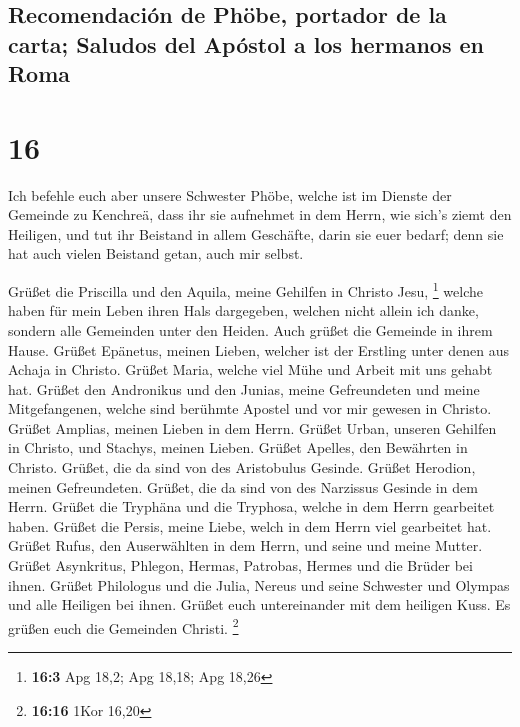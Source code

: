 \hypertarget{recomendaciuxf3n-de-phuxf6be-portador-de-la-carta-saludos-del-apuxf3stol-a-los-hermanos-en-roma}{%
\subsection{Recomendación de Phöbe, portador de la carta; Saludos del
Apóstol a los hermanos en
Roma}\label{recomendaciuxf3n-de-phuxf6be-portador-de-la-carta-saludos-del-apuxf3stol-a-los-hermanos-en-roma}}

\hypertarget{section-15}{%
\section{16}\label{section-15}}

 Ich befehle euch aber unsere Schwester Phöbe, welche ist
im Dienste der Gemeinde zu Kenchreä,  dass ihr sie
aufnehmet in dem Herrn, wie sich's ziemt den Heiligen, und tut ihr
Beistand in allem Geschäfte, darin sie euer bedarf; denn sie hat auch
vielen Beistand getan, auch mir selbst.

 Grüßet die Priscilla und den Aquila, meine Gehilfen in
Christo Jesu, \footnote{\textbf{16:3} Apg 18,2; Apg 18,18; Apg 18,26}
 welche haben für mein Leben ihren Hals dargegeben,
welchen nicht allein ich danke, sondern alle Gemeinden unter den Heiden.
 Auch grüßet die Gemeinde in ihrem Hause. Grüßet Epänetus,
meinen Lieben, welcher ist der Erstling unter denen aus Achaja in
Christo.  Grüßet Maria, welche viel Mühe und Arbeit mit
uns gehabt hat.  Grüßet den Andronikus und den Junias,
meine Gefreundeten und meine Mitgefangenen, welche sind berühmte Apostel
und vor mir gewesen in Christo.  Grüßet Amplias, meinen
Lieben in dem Herrn.  Grüßet Urban, unseren Gehilfen in
Christo, und Stachys, meinen Lieben.  Grüßet Apelles, den
Bewährten in Christo. Grüßet, die da sind von des Aristobulus Gesinde.
 Grüßet Herodion, meinen Gefreundeten. Grüßet, die da
sind von des Narzissus Gesinde in dem Herrn.  Grüßet die
Tryphäna und die Tryphosa, welche in dem Herrn gearbeitet haben. Grüßet
die Persis, meine Liebe, welch in dem Herrn viel gearbeitet hat.
 Grüßet Rufus, den Auserwählten in dem Herrn, und seine
und meine Mutter.  Grüßet Asynkritus, Phlegon, Hermas,
Patrobas, Hermes und die Brüder bei ihnen.  Grüßet
Philologus und die Julia, Nereus und seine Schwester und Olympas und
alle Heiligen bei ihnen.  Grüßet euch untereinander mit
dem heiligen Kuss. Es grüßen euch die Gemeinden Christi. \footnote{\textbf{16:16}
  1Kor 16,20}

